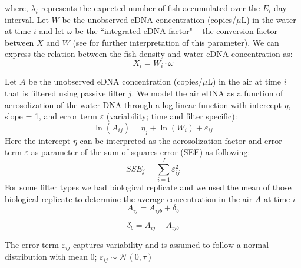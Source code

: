 \documentclass{article}
\begin{document}
where, $\lambda_i$ represents the expected number of fish accumulated over the $E_i$-day interval. Let $W$ be the unobserved eDNA concentration (copies/$\mu$L) in the water at time $i$ and let $\omega$ be the ``integrated eDNA factor" -- the conversion factor between $X$ and $W$ (see \cite{guri2024a} for further interpretation of this parameter). We can express the relation between the fish density and water eDNA concentration as:
\begin{equation}
X_{i} = W_{i} \cdot \omega
\end{equation}

Let $A$ be the unobserved eDNA concentration (copies/$\mu$L) in the air at time $i$ that is filtered using passive filter $j$. We model the air eDNA as a function of aerosolization of the water DNA through a log-linear function with intercept $\eta$, slope = 1, and error term $\varepsilon$ (variability; time and filter specific):
\begin{equation}
\ln(A_{ij}) = \eta_{j} + \ln(W_{i}) + \varepsilon_{ij}
\end{equation}
Here the intercept $\eta$ can be interpreted as the aerosolization factor and error term $\varepsilon$ as parameter of the sum of squares error (SEE) as following:
\begin{equation*}
SSE_j = \sum_{i=1}^{I}\varepsilon_{ij}^2
\end{equation*}
For some filter types we had biological replicate and we used the mean of those biological replicate to determine the average concentration in the air $A$ at time $i$
\begin{equation}
A_{ij} = A_{ijb} + \delta_b
\end{equation}

\begin{equation}
\delta_{b} = A_{ij} - A_{ijb}
\end{equation}

The error term $\varepsilon_{ij}$ captures variability and is assumed to follow a normal distribution with mean 0; $\varepsilon_{ij} \sim \mathcal{N}(0,\tau)$ 



\newpage
\end{document}
